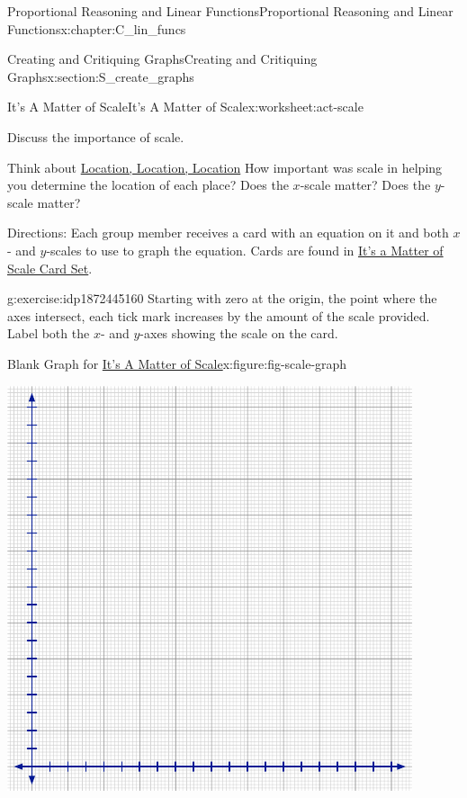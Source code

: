 \documentclass[oneside,10pt,]{book}
\numberwithin{equation}{chapter}
\begin{document}
\begin{chapterptx}{Proportional Reasoning and Linear Functions}{}{Proportional Reasoning and Linear Functions}{}{}{x:chapter:C_lin_funcs}
\begin{sectionptx}{Creating and Critiquing Graphs}{}{Creating and Critiquing Graphs}{}{}{x:section:S_create_graphs}
\begin{worksheet-subsection}{It's A Matter of Scale}{}{It's A Matter of Scale}{}{}{x:worksheet:act-scale}
\begin{introduction}{}
\begin{itemize}[label=\textbullet]
\end{itemize}
Discuss the importance of scale.%
\par
Think about \hyperref[x:worksheet:act-location]{Location, Location, Location} How important was scale in helping you determine the location of each place? Does the \(x\)-scale matter? Does the \(y\)-scale matter?%
\par
Directions: Each group member receives a card with an equation on it and both \(x\)- and \(y\)-scales to use to graph the equation. Cards are found in \hyperref[x:worksheet:scale-cards]{It's a Matter of Scale Card Set}.%
\end{introduction}%
\begin{divisionexercise}{1}{}{}{g:exercise:idp1872445160}%
Starting with zero at the origin, the point where the axes intersect, each tick mark increases by the amount of the scale provided. Label both the \(x\)- and \(y\)-axes showing the scale on the card.%
\begin{figureptx}{Blank Graph for \hyperref[x:worksheet:act-scale]{It's A Matter of Scale}}{x:figure:fig-scale-graph}{}%
\begin{image}{0.15}{0.7}{0.15}%
\includegraphics[width=\linewidth]{external/blank-graph.pdf}
\end{image}%
\tcblower
\end{figureptx}%

\end{divisionexercise}
\end{worksheet-subsection}
\end{sectionptx}
\end{chapterptx}
\end{document}
